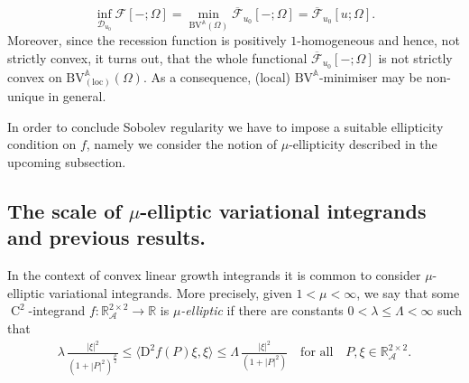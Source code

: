 \documentclass[a4paper,10pt,reqno,oneside]{amsart}
\numberwithin{equation}{section}
\newcommand{\R}{\mathbb R}
\newcommand{\A}{\mathscr{A}}
\newcommand{\Aop}{\mathbb{A}}
\newcommand{\hold}{\operatorname{C}}
\newcommand{\BV}{\mathrm{BV}}
\newcommand{\loc}{\mathrm{loc}}
\newcommand{\D}{\mathrm{D}}
\newcommand{\abs}[1]{\left\lvert#1\right\rvert}
\newcommand{\F}{\mathscr{F}}
\begin{document}
\begin{equation}\label{eq:ConsistencyRelation}
\inf_{\mathscr{D}_{u_0}} \F[-; \Omega] = \min_{\BV^{\Aop}(\Omega)}\overline{\F}_{u_0}[-;\Omega] = \overline{\F}_{u_0}[u;\Omega]. 
\end{equation}
Moreover, since the recession function is positively $1$-homogeneous and hence, not strictly convex, it turns out, that the whole functional $\overline{\F}_{u_0}[-;\Omega]$ is not strictly convex on $\BV^\Aop_{(\loc)}(\Omega)$. As a consequence, (local) $\BV^\Aop$-minimiser may be non-unique in general. 

In order to conclude Sobolev regularity we have to impose a suitable ellipticity condition on $f$, namely we consider the notion of $\mu$-ellipticity described in the upcoming subsection.
\subsection{The scale of $\mu$-elliptic variational integrands and previous results.} In the context of convex linear growth integrands it is common to consider $\mu$-elliptic variational integrands. More precisely, given $1<\mu<\infty$,  we say that some $\hold^2$-integrand $f\colon\R^{2\times2}_\A\to \R$ is \emph{$\mu$-elliptic} if there are constants $0<\lambda \leq \Lambda<\infty$ such that
\begin{align}\label{eq:MuEllipticity}
	\lambda \,\frac{\abs{\xi}^2}{(1+\abs{P}^2)^\frac{\mu}{2}}\leq \langle \D^2f(P)\xi,\xi\rangle\leq\Lambda\,\frac{\abs{\xi}^2}{(1+\abs{P}^2)} \quad\mbox{for all}\quad P,\xi\in\R^{2\times 2}_{\A}.
\end{align}
\end{document}

